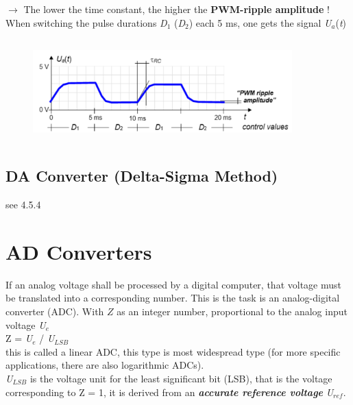 $\rightarrow$ The lower the time constant, the higher the \textbf{PWM-ripple amplitude} ! \\

When switching the pulse durations \textit{D}${}_{1}$ (\textit{D}${}_{2}$) each 5 ms, one gets the signal \textit{U${}_{a}$}(\textit{t})

    \begin{figure}[h]
    \centering
    \includegraphics[width=10cm, height=4cm]{Images/image173.png}
    \label{fig:Fig 127}
    \end{figure}

\subsection{DA Converter (Delta-Sigma Method)}

see 4.5.4

\section{AD Converters}

If an analog voltage shall be processed by a digital computer, that voltage must be translated into a corresponding number. This is the task is an analog-digital converter (ADC). With \textit{$Z$} as an integer number, proportional to the analog input voltage \textit{U}${}_{e}$\\

Z\textit{ }= \textit{U${}_{e}$} / \textit{U}${}_{LSB}$\\

this is called a linear ADC, this type is most widespread type (for more specific applications, there are also logarithmic ADCs).\\

\textit{U${}_{LSB}$} is the voltage unit for the least significant bit (LSB), that is the voltage corresponding to $\mathrm{Z}$ = 1, it is derived from an \textbf{\textit{accurate reference voltage}} \textit{U${}_{ref}$}.\\

